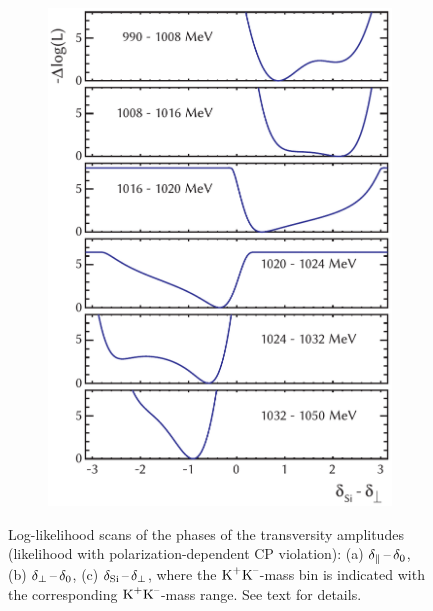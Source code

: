 \begin{figure}[tbp]
  \vspace*{0.02\textwidth}
  \begin{subfigure}{0.55\textwidth}
    \includegraphics[width=\textwidth]{graphics/results/NLL_polarDep_SWavePhases}
    \caption{}
  \end{subfigure}

  \caption{Log-likelihood scans of the phases of the transversity amplitudes (likelihood with polarization-dependent CP violation):
           (a) $\delparzero$, (b) $\delperpzero$,
           (c) $\delSperp[i]$, where the $\KK$-mass bin is indicated with the corresponding $\KK$-mass range.
           See text for details.}
  \label{fig:NLL_polarDep_transPhases}
\end{figure}

